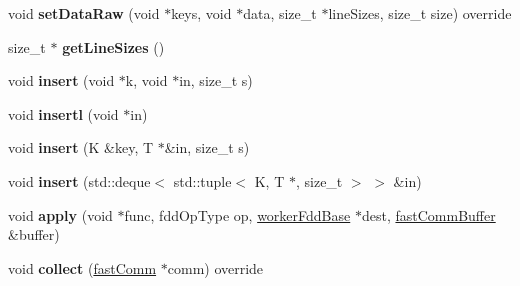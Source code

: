 \begin{DoxyCompactItemize}
\item 
\hypertarget{classfaster_1_1__workerIFdd_3_01K_00_01T_01_5_01_4_a57c605c3fa28525e1d9e7298f51c9eba}{}void {\bfseries set\+Data\+Raw} (void $\ast$keys, void $\ast$data, size\+\_\+t $\ast$line\+Sizes, size\+\_\+t size) override\label{classfaster_1_1__workerIFdd_3_01K_00_01T_01_5_01_4_a57c605c3fa28525e1d9e7298f51c9eba}

\item 
\hypertarget{classfaster_1_1__workerIFdd_3_01K_00_01T_01_5_01_4_a1a6bdf20b26f016eae195a4413abe1ba}{}size\+\_\+t $\ast$ {\bfseries get\+Line\+Sizes} ()\label{classfaster_1_1__workerIFdd_3_01K_00_01T_01_5_01_4_a1a6bdf20b26f016eae195a4413abe1ba}

\item 
\hypertarget{classfaster_1_1__workerIFdd_3_01K_00_01T_01_5_01_4_a3db09bd9059972c58ca4c80c6e91f708}{}void {\bfseries insert} (void $\ast$k, void $\ast$in, size\+\_\+t s)\label{classfaster_1_1__workerIFdd_3_01K_00_01T_01_5_01_4_a3db09bd9059972c58ca4c80c6e91f708}

\item 
\hypertarget{classfaster_1_1__workerIFdd_3_01K_00_01T_01_5_01_4_abc6e05cdc657b13d1be0f982bb10fc39}{}void {\bfseries insertl} (void $\ast$in)\label{classfaster_1_1__workerIFdd_3_01K_00_01T_01_5_01_4_abc6e05cdc657b13d1be0f982bb10fc39}

\item 
\hypertarget{classfaster_1_1__workerIFdd_3_01K_00_01T_01_5_01_4_a35dcc846531b81fc275c27543431c4f4}{}void {\bfseries insert} (K \&key, T $\ast$\&in, size\+\_\+t s)\label{classfaster_1_1__workerIFdd_3_01K_00_01T_01_5_01_4_a35dcc846531b81fc275c27543431c4f4}

\item 
\hypertarget{classfaster_1_1__workerIFdd_3_01K_00_01T_01_5_01_4_a080a81ca5fe2ccb6b334cf7f79687592}{}void {\bfseries insert} (std\+::deque$<$ std\+::tuple$<$ K, T $\ast$, size\+\_\+t $>$ $>$ \&in)\label{classfaster_1_1__workerIFdd_3_01K_00_01T_01_5_01_4_a080a81ca5fe2ccb6b334cf7f79687592}

\item 
\hypertarget{classfaster_1_1__workerIFdd_3_01K_00_01T_01_5_01_4_ad7a6eec794f2e76aea09cfc13549f4fa}{}void {\bfseries apply} (void $\ast$func, fdd\+Op\+Type op, \hyperlink{classfaster_1_1workerFddBase}{worker\+Fdd\+Base} $\ast$dest, \hyperlink{classfaster_1_1fastCommBuffer}{fast\+Comm\+Buffer} \&buffer)\label{classfaster_1_1__workerIFdd_3_01K_00_01T_01_5_01_4_ad7a6eec794f2e76aea09cfc13549f4fa}

\item 
\hypertarget{classfaster_1_1__workerIFdd_3_01K_00_01T_01_5_01_4_a08a086dbb306041e85d9191312a9dd8a}{}void {\bfseries collect} (\hyperlink{classfaster_1_1fastComm}{fast\+Comm} $\ast$comm) override\label{classfaster_1_1__workerIFdd_3_01K_00_01T_01_5_01_4_a08a086dbb306041e85d9191312a9dd8a}

\end{DoxyCompactItemize}
